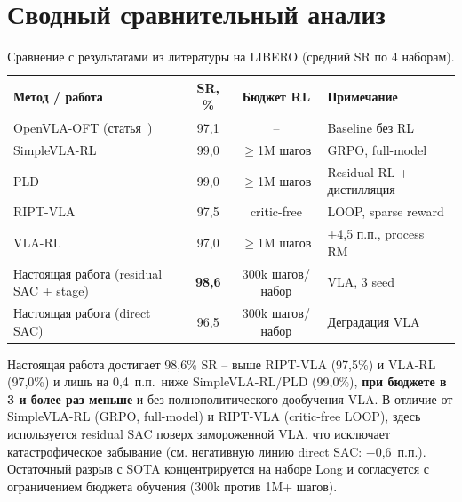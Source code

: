 \section{Сводный сравнительный анализ}
\label{sec:comparison}

\begin{table}[htbp]
\caption{Сравнение с результатами из литературы на LIBERO (средний SR по 4 наборам).}
\label{tab:literature_sota}
\centering
\footnotesize
\setlength{\tabcolsep}{4pt}
\begin{tabularx}{\textwidth}{@{}>{\raggedright\arraybackslash}Xcc>{\raggedright\arraybackslash}X@{}}
\toprule
\textbf{Метод / работа} & \textbf{SR, \%} & \textbf{Бюджет RL} & \textbf{Примечание} \\
\midrule
OpenVLA-OFT (статья~\cite{kim2025fine}) & 97{,}1 & -- & Baseline без RL \\
SimpleVLA-RL~\cite{simplevlarl2025}           & 99{,}0 & $\geq$1M шагов & GRPO, full-model \\
PLD~\cite{pld2026}                            & 99{,}0 & $\geq$1M шагов & Residual RL + дистилляция \\
RIPT-VLA~\cite{riptvla2025}                   & 97{,}5 & critic-free & LOOP, sparse reward \\
VLA-RL~\cite{vlarl2025}                        & 97{,}0 & $\geq$1M шагов & +4,5 п.п., process RM \\
Настоящая работа (residual SAC + stage)       & \textbf{98{,}6} & 300k шагов/набор & 9 VLA, 3 seed \\
Настоящая работа (direct SAC)                & 96{,}5 & 300k шагов/набор & Деградация VLA \\
\bottomrule
\end{tabularx}
\end{table}

    Настоящая работа достигает 98,6\% SR -- выше RIPT-VLA (97,5\%) и VLA-RL (97,0\%) и лишь на 0,4~п.п.\ ниже SimpleVLA-RL/PLD (99,0\%), \textbf{при бюджете в 3 и более раз меньше} и без полнополитического дообучения VLA. В отличие от SimpleVLA-RL (GRPO, full-model) и RIPT-VLA (critic-free LOOP), здесь используется residual SAC поверх замороженной VLA, что исключает катастрофическое забывание (см. негативную линию direct SAC: $-$0,6~п.п.). Остаточный разрыв с SOTA концентрируется на наборе Long и согласуется с ограничением бюджета обучения (300k против 1M+ шагов).

